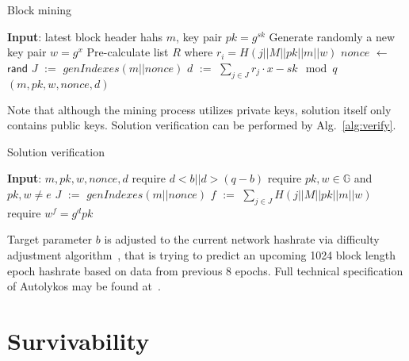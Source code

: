 \documentclass[]{article}
\def\Let#1#2{\State #1 $:=$ #2}
\def\LetRnd#1#2{\State #1 $\gets$ #2}
\begin{document}
    \begin{algorithm}[H]
        \caption{Block mining}
        \label{alg:prove}
        \begin{algorithmic}[1]
            \State \textbf{Input}: latest block header hahs $m$, key pair $pk=g^{sk}$
            \State Generate randomly a new key pair $w=g^x$
            \State Pre-calculate list $R$ where $r_i=H(j||M||pk||m||w)$
            \LetRnd{$nonce$}{$\mathsf{rand}$}
            \Let{$J$}{$genIndexes(m||nonce)$}
            \Let{$d$}{$\sum_{j \in J}{r_j} \cdot x - sk \mod q$}
            \State \Return $(m,pk,w,nonce,d)$
            \EndIf
            \EndWhile
        \end{algorithmic}
    \end{algorithm}

    Note that although the mining process utilizes private keys, solution itself
    only contains public keys. Solution verification can be performed by Alg.~\ref{alg:verify}.

    \begin{algorithm}[H]
        \caption{Solution verification}
        \label{alg:verify}
        \begin{algorithmic}[1]
            \State \textbf{Input}: $m,pk,w,nonce,d$
            \State require $d < b || d > (q - b)$
            \State require $pk,w\in \mathbb{G}$ and $pk,w \ne e$
            \Let{$J$}{$genIndexes(m||nonce)$}
            \Let{$f$}{$\sum_{j \in J} H(j||M||pk||m||w)$}
            \State require $w^f = g^dpk$
        \end{algorithmic}
    \end{algorithm}

    Target parameter $b$ is adjusted to the current network hashrate via difficulty adjustment
    algorithm~\cite{meshkov2017short}, that is trying to predict an upcoming 1024 block length
    epoch hashrate based  on data from previous 8 epochs.
    Full technical specification of Autolykos may be found at~\cite{Ergopow}.




    \section{Survivability}
    \label{sec:survivability}

\end{document}

